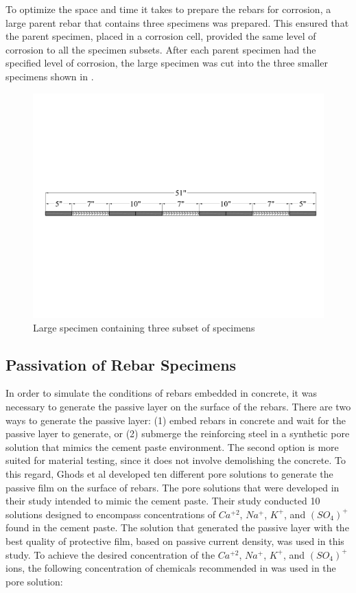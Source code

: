 To optimize the space and time it takes to prepare the rebars for corrosion, a large parent rebar that contains three specimens was prepared. This ensured that the parent specimen, placed in a corrosion cell, provided the same level of corrosion to all the specimen subsets. After each parent specimen had the specified level of corrosion, the large specimen was cut into the three smaller specimens shown in .

\begin{figure}[htbp]
	\centering
	\includegraphics[width=1.0\textwidth]{Chapter-3/figs/LargeSpecimen}
	\caption{Large specimen containing three subset of specimens}
	\label{fig:LargeSpecimen}
\end{figure}

\subsection{Passivation of Rebar Specimens}

In order to simulate the conditions of rebars embedded in concrete, it was necessary to generate the passive layer on the surface of the rebars. There are two ways to generate the passive layer: (1) embed rebars in concrete and wait for the passive layer to generate, or (2) submerge the reinforcing steel in a synthetic pore solution that mimics the cement paste environment. The second option is more suited for material testing, since it does not involve demolishing the concrete. To this regard, Ghods et al \cite{Ghods2010} developed ten different pore solutions to generate the passive film on the surface of rebars. The pore solutions that were developed in their study intended to mimic the cement paste. Their study conducted 10 solutions designed to encompass concentrations of $Ca^{+2}$, $Na^{+}$, $K^{+}$, and $(SO_{4})^{+}$ found in the cement paste. The solution that generated the passive layer with the best quality of protective film, based on passive current density, was used in this study. To achieve the desired concentration of the $Ca^{+2}$, $Na^{+}$, $K^{+}$, and $(SO_{4})^{+}$ ions, the following concentration of chemicals recommended in \cite{Ghods2010} was used in the pore solution:

